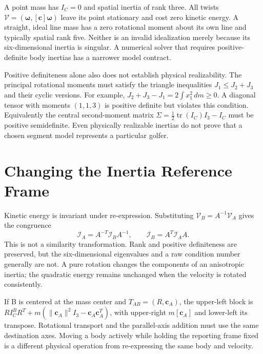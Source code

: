 A point mass has $I_C=0$ and spatial inertia of rank three. All twists $\mathcal V=(\boldsymbol\omega,[\mathbf c]\boldsymbol\omega)$ leave its point stationary and cost zero kinetic energy. A straight, ideal line mass has a zero rotational moment about its own line and typically spatial rank five. Neither is an invalid idealization merely because its six-dimensional inertia is singular. A numerical solver that requires positive-definite body inertias has a narrower model contract.

Positive definiteness alone also does not establish physical realizability. The principal rotational moments must satisfy the triangle inequalities $J_1\le J_2+J_3$ and their cyclic versions. For example, $J_2+J_3-J_1=2\int x_1^2\,dm\ge0$. A diagonal tensor with moments $(1,1,3)$ is positive definite but violates this condition. Equivalently the central second-moment matrix $\Sigma=\tfrac12\operatorname{tr}(I_C)I_3-I_C$ must be positive semidefinite. Even physically realizable inertias do not prove that a chosen segment model represents a particular golfer.

\section{Changing the Inertia Reference Frame}
\label{sec:parallel_axis_6d}
\label{thm:parallel_axis_6d}

Kinetic energy is invariant under re-expression. Substituting $\mathcal V_B=A^{-1}\mathcal V_A$ gives the congruence
\begin{equation}
\mathcal I_A=A^{-T}\mathcal I_B A^{-1},\qquad
\mathcal I_B=A^T\mathcal I_A A.
\label{eq:parallel_axis_6d}
\end{equation}
This is not a similarity transformation. Rank and positive definiteness are preserved, but the six-dimensional eigenvalues and a raw condition number generally are not. A pure rotation changes the components of an anisotropic inertia; the quadratic energy remains unchanged when the velocity is rotated consistently.

If B is centered at the mass center and $T_{AB}=(R,\mathbf c_A)$, the upper-left block is $RI_C^BR^T+m(\|\mathbf c_A\|^2I_3-\mathbf c_A\mathbf c_A^T)$, with upper-right $m[\mathbf c_A]$ and lower-left its transpose. Rotational transport and the parallel-axis addition must use the same destination axes. Moving a body actively while holding the reporting frame fixed is a different physical operation from re-expressing the same body and velocity.

